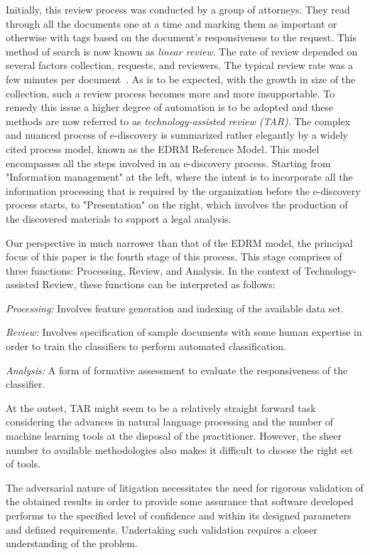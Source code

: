 \documentclass{sig-alternate-05-2015}
\newcommand{\bi}{\begin{itemize*}}
\newcommand{\ei}{\end{itemize*}}
\begin{document}
Initially, this review process was conducted by a group of attorneys. They read through all the documents one at a time and marking them as important or otherwise with tags based on the document's responsiveness to the request. This method of search is now known as \textit{linear review}. The rate of review depended on several factors collection, requests, and reviewers. The typical review rate was a few minutes per document~\cite{}. As is to be expected, with the growth in size of the collection, such a review process becomes more and more insupportable. To remedy this issue a higher degree of automation is to be adopted and these methods are now referred to as \textit{technology-assisted review (TAR)}.
%
The complex and nuanced process of e-discovery is summarized rather elegantly by a widely cited process model, known as the EDRM Reference Model. This model encompasses all the steps involved in an e-discovery process. Starting from "Information management" at the left, where the intent is to incorporate all the information processing that is required by the organization before the e-discovery process starts, to "Presentation" on the right, which involves the production of the discovered materials to support a legal analysis.

Our perspective in much narrower than that of the EDRM model, the principal focus of this paper is the fourth stage of this process. This stage comprises of three functions: Processing, Review, and Analysis. In the context of Technology-assisted Review, these functions can be interpreted as follows:
\bi
    \item \textit{Processing: } Involves feature generation and indexing of the available data set.
    \item \textit{Review: } Involves specification of sample documents with some human expertise in order to train the classifiers to perform automated classification.
    \item \textit{Analysis: } A form of formative assessment to evaluate the responsiveness of the classifier.
\ei

At the outset, TAR might seem to be a relatively straight forward task considering the advances in natural language processing and the number of machine learning tools at the disposal of the practitioner. However, the sheer number to available methodologies also makes it difficult to choose the right set of tools. 

The adversarial nature of litigation necessitates the need for rigorous validation of the obtained results in order to provide some assurance that software developed performs to the specified level of confidence and within its designed parameters and defined requirements. Undertaking such validation requires a closer understanding of the problem. 
\end{document}
